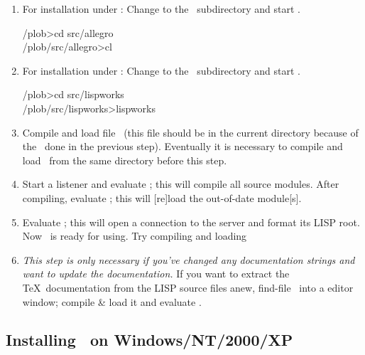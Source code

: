 \begin{enumerate}
\item\label{itm:lisp}For installation under \allegrocl: Change to the
  \ subdirectory and start
  \allegro.\\[\smallskipamount]
\begin{tt}\CodeSize
\td/plob>cd src/allegro\\
\td/plob/src/allegro>cl
\end{tt}

\item For installation under \lwcl: Change to the
  \ subdirectory and start
  \lw.\\[\smallskipamount]
\begin{tt}\CodeSize
\td/plob>cd src/lispworks\\
\td/plob/src/lispworks>lispworks
\end{tt}

\item\label{itm:compile} Compile and load file
  \ (this file should be in the current
  directory because of the \ done in the previous step).
  Eventually it is necessary to compile and load
  \ from the same directory before this step.

\item Start a listener and evaluate ; this
  will compile all source modules.  After compiling, evaluate
  ; this will [re]load the out-of-date module[s].

\item Evaluate ; this will open a connection
  to the server and format its LISP root. Now \plob\ is ready for
  using.  Try compiling and loading 

\item\label{itm:last} \emph{This step is only necessary if you've
    changed any documentation strings and want to update the
    documentation.} If you want to extract the \TeX\ documentation
  from the LISP source files anew, find-file
  \ into a
  editor window; compile \& load it and evaluate
  .

\end{enumerate}

\subsection[Installing PLOB on NT/2000/XP]%
{Installing \protect\plob\ on Windows/NT/2000/XP}%
\label{sec:installnt}

